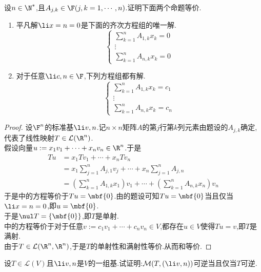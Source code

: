 \documentclass{ctexart}
\begin{document}
\begin{problem}[21.]
    设$n\in\N^*$,且$A_{j,k}\in\F(j,k=1,\cdots,n)$.证明下面两个命题等价.
    \begin{enumerate}[label=\tbf{(\arabic*)}]
        \item 平凡解$\li x=n=0$是下面的齐次方程组的唯一解.
            $$\left\{\begin{array}{c}
                \displaystyle\sum_{k=1}^{n}A_{1,k}x_k=0\\
                \vdots\\
                \displaystyle\sum_{k=1}^{n}A_{n,k}x_k=0
            \end{array}\right.$$
        \item 对于任意$\li c,n\in\F$,下列方程组都有解.
            $$\left\{\begin{array}{c}
                \displaystyle\sum_{k=1}^{n}A_{1,k}x_k=c_1\\
                \vdots\\
                \displaystyle\sum_{k=1}^{n}A_{n,k}x_k=c_n
            \end{array}\right.$$
    \end{enumerate}
\end{problem}
\begin{proof}
    设$\F^{n}$的标准基$\li v,n$.记$n\times n$矩阵$A$的第$j$行第$k$列元素由题设的$A_{j,k}$确定,代表了线性映射$T\in\mathcal{L}(\R^n)$.\\
    假设向量$u:=x_1v_1+\cdots+x_nv_n\in\R^n$.于是
    $$\begin{aligned}
        Tu
        &= x_1Tv_1+\cdots+x_nTv_n \\
        &= x_1\sum_{j=1}^{n}A_{j,1}v_j+\cdots+x_n\sum_{j=1}^{n}A_{j,n} \\
        &= \left(\sum_{k=1}^{n}A_{1,k}x_1\right)v_1+\cdots+\left(\sum_{k=1}^{n}A_{n,k}x_n\right)v_n
    \end{aligned}$$
    于是中的方程等价于$Tu=\mbf{0}$.由的题设可知$Tu=\mbf{0}$当且仅当$\li x=n=0$,即$u=\mbf{0}$.\\
    于是$\nul T=\left\{\mbf{0}\right\}$,即$T$是单射.\\
    中的方程等价于对于任意$v:=c_1v_1+\cdots+c_nv_n\in V$,都存在$u\in V$使得$Tu=v$,即$T$是满射.\\
    由于$T\in\mathcal{L}(\R^n,\R^n)$,于是$T$的单射性和满射性等价.从而和等价.
\end{proof}
\begin{problem}[22.]
    设$T\in\mathcal{L}(V)$且$\li v,n$是$V$的一组基.试证明:$\mathcal{M}(T,(\li v,n))$可逆当且仅当$T$可逆.
\end{problem}
\end{document}

